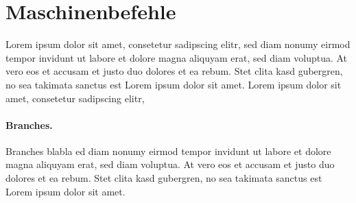 \section{Maschinenbefehle}
Lorem ipsum dolor sit amet, consetetur sadipscing elitr, sed diam nonumy eirmod tempor invidunt ut labore et dolore magna aliquyam erat, sed diam voluptua. At vero eos et accusam et justo duo dolores et ea rebum. Stet clita kasd gubergren, no sea takimata sanctus est Lorem ipsum dolor sit amet. Lorem ipsum dolor sit amet, consetetur sadipscing elitr,
\paragraph{Branches.} Branches blabla ed diam nonumy eirmod tempor invidunt ut labore et dolore magna aliquyam erat, sed diam voluptua. At vero eos et accusam et justo duo dolores et ea rebum. Stet clita kasd gubergren, no sea takimata sanctus est Lorem ipsum dolor sit amet.

